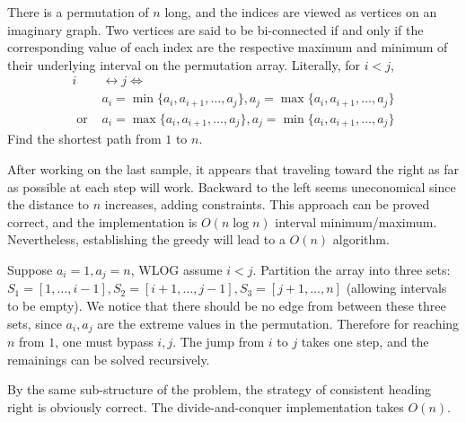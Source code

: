 \documentclass[../../main]{subfiles}
\begin{document}

There is a permutation of $n$ long, and the indices are viewed as vertices on 
an imaginary graph. Two vertices are said to be bi-connected if and only if the
corresponding value of each index are the respective maximum and minimum of their 
underlying interval on the permutation array. Literally, for $i < j$, 
\begin{align*}
    i &\leftrightarrow j \iff \\
    &a_i = \min\{a_i, a_{i+1}, \ldots, a_j\}, a_j = \max\{a_i, a_{i+1}, \ldots, a_j\} \\
    \text{ or } &a_i = \max\{a_i, a_{i+1}, \ldots, a_j\}, a_j = \min\{a_i, a_{i+1}, \ldots, a_j\}
\end{align*}
Find the shortest path from $1$ to $n$.


After working on the last sample, it appears that traveling toward the right 
as far as possible at each step will work. Backward to the left seems uneconomical 
since the distance to $n$ increases, adding constraints. This approach can be proved correct, 
and the implementation is $O(n\log n)$ interval minimum/maximum. 
Nevertheless, establishing the greedy will lead to a $O(n)$ algorithm. 

Suppose $a_i = 1, a_j = n$, WLOG assume $i < j$. Partition the array into three sets:
$S_1 = [1, \ldots, i-1], S_2 = [i+1, \ldots, j-1], S_3 = [j+1, \ldots, n]$ 
(allowing intervals to be empty).
We notice that there should be no edge from between these three sets, since $a_i, a_j$ are
the extreme values in the permutation. Therefore for reaching $n$ from $1$, one must bypass
$i, j$. The jump from $i$ to $j$ takes one step, and the remainings can be solved recursively.

By the same sub-structure of the problem, the strategy of consistent heading right is obviously 
correct. The divide-and-conquer implementation takes $O(n)$.
\end{document}
